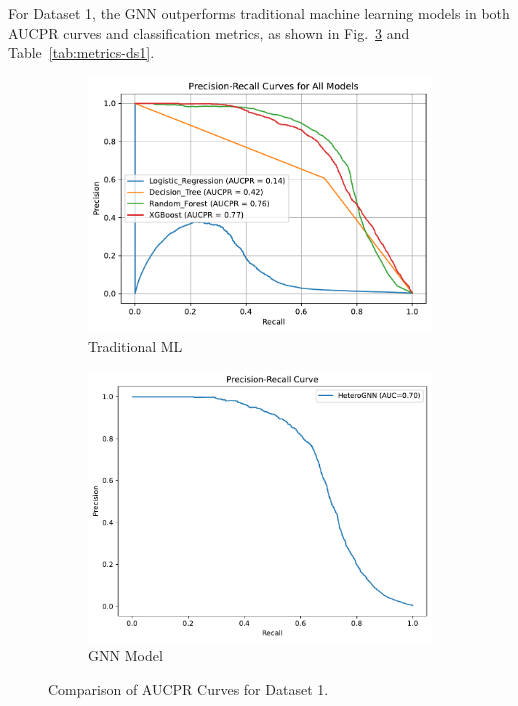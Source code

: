 \documentclass[conference]{IEEEtran}
\begin{document}
For Dataset 1, the GNN outperforms traditional machine learning models in both AUCPR curves and classification metrics, as shown in Fig.~\ref{fig:aucpr-comparison-ds1} and Table~\ref{tab:metrics-ds1}.

\begin{figure}[htbp]
    \centering
    \begin{subfigure}{\columnwidth}
        \centering
        \includegraphics[width=0.7\columnwidth]{AUCPR Curve ML.pdf}
        \caption{Traditional ML}
        \label{fig:aucpr-ml}
    \end{subfigure}
    
    \vspace{0.3cm}
    
    \begin{subfigure}{\columnwidth}
        \centering
        \includegraphics[width=0.7\columnwidth]{AUCPR GNN DS1.pdf}
        \caption{GNN Model}
        \label{fig:aucpr-gnn}
    \end{subfigure}
    
    \caption{Comparison of AUCPR Curves for Dataset 1.}
    \label{fig:aucpr-comparison-ds1}
\end{figure}
\end{document}
